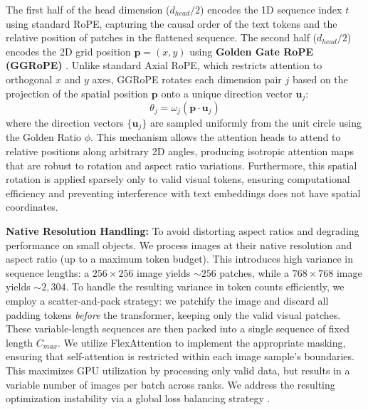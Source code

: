 The first half of the head dimension ($d_{head}/2$) encodes the 1D sequence index $t$ using standard RoPE, capturing the causal order of the text tokens and the relative position of patches in the flattened sequence. The second half ($d_{head}/2$) encodes the 2D grid position $\mathbf{p} = (x, y)$ using \textbf{Golden Gate RoPE (GGRoPE)} \citep{xiong2025ndrope}. Unlike standard Axial RoPE, which restricts attention to orthogonal $x$ and $y$ axes, GGRoPE rotates each dimension pair $j$ based on the projection of the spatial position $\mathbf{p}$ onto a unique direction vector $\mathbf{u}_j$:
\begin{equation}
\theta_j = \omega_j (\mathbf{p} \cdot \mathbf{u}_j)
\end{equation}
where the direction vectors $\{\mathbf{u}_j\}$ are sampled uniformly from the unit circle using the Golden Ratio $\phi$. This mechanism allows the attention heads to attend to relative positions along arbitrary 2D angles, producing isotropic attention maps that are robust to rotation and aspect ratio variations. Furthermore, this spatial rotation is applied sparsely only to valid visual tokens, ensuring computational efficiency and preventing interference with text embeddings does not have spatial coordinates.

\noindent \textbf{Native Resolution Handling:} To avoid distorting aspect ratios and degrading performance on small objects. We process images at their native resolution and aspect ratio (up to a maximum token budget). This introduces high variance in sequence lengths: a $256 \times 256$ image yields $\sim 256$ patches, while a $768 \times 768$ image yields $\sim 2,304$. To handle the resulting variance in token counts efficiently, we employ a scatter-and-pack strategy: we patchify the image and discard all padding tokens \textit{before} the transformer, keeping only the valid visual patches. These variable-length sequences are then packed into a single sequence of fixed length $C_{max}$. We utilize FlexAttention to implement the appropriate masking, ensuring that self-attention is restricted within each image sample's boundaries. This maximizes GPU utilization by processing only valid data, but results in a variable number of images per batch across ranks. We address the resulting optimization instability via a global loss balancing strategy \citep{chaybouti2025amoe}.




